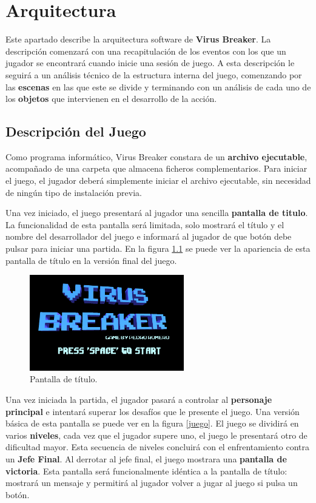 \chapter{Arquitectura}
\label{Arquitectura}
Este apartado describe la arquitectura software de \textbf{Virus Breaker}. La descripción comenzará con una recapitulación de los eventos con los que un jugador se encontrará cuando inicie una sesión de juego. A esta descripción le seguirá a un análisis técnico de la estructura interna del juego, comenzando por las \textbf{escenas} en las que este se divide y terminando con un análisis de cada uno de los \textbf{objetos} que intervienen en el desarrollo de la acción.

\section{Descripción del Juego}
Como programa informático, Virus Breaker constara de un \textbf{archivo ejecutable}, acompañado de una carpeta que almacena ficheros complementarios. Para iniciar el juego, el jugador deberá simplemente iniciar el archivo ejecutable, sin necesidad de ningún tipo de instalación previa.

Una vez iniciado, el juego presentará al jugador una sencilla \textbf{pantalla de titulo}. La funcionalidad de esta pantalla será limitada, solo mostrará el título y el nombre del desarrollador del juego e informará al jugador de que botón debe pulsar para iniciar una partida. En la figura \ref{titulo} se puede ver la apariencia de esta pantalla de título en la versión final del juego.
\begin{figure}[h]
    \centering
    \includegraphics[width=0.6\textwidth]{images/estructura/descripcion/titulo}
    \caption{Pantalla de título.}
    \label{titulo}
\end{figure}

Una vez iniciada la partida, el jugador pasará a controlar al \textbf{personaje principal} e intentará superar los desafíos que le presente el juego. Una versión básica de esta pantalla se puede ver en la figura \ref{juego}. El juego se dividirá en varios \textbf{niveles}, cada vez que el jugador supere uno, el juego le presentará otro de dificultad mayor. Esta secuencia de niveles concluirá con el enfrentamiento contra un \textbf{Jefe Final}. Al derrotar al jefe final, el juego mostrara una \textbf{pantalla de victoria}. Esta pantalla será funcionalmente idéntica a la pantalla de título: mostrará un mensaje y permitirá al jugador volver a jugar al juego si pulsa un botón. 

